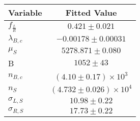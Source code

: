 \begin{tabular}[t]{lc}
\hline
Variable &Fitted Value\\
\hline\hline
$f_{\frac{L}{R}}$&$0.421\pm0.021$\\
\hline
$\lambda_{B,c}$&$-0.00178\pm0.00031$\\
\hline
$\mu_S$&$5278.871\pm0.080$\\
\hline
B&$1052\pm43$\\
\hline
$n_{B,c}$&$(4.10\pm0.17)\times 10^3$\\
\hline
$n_S$&$(4.732\pm0.026)\times 10^4$\\
\hline
$\sigma_{L, S}$&$10.98\pm0.22$\\
\hline
$\sigma_{R, S}$&$17.73\pm0.22$\\
\hline
\end{tabular}